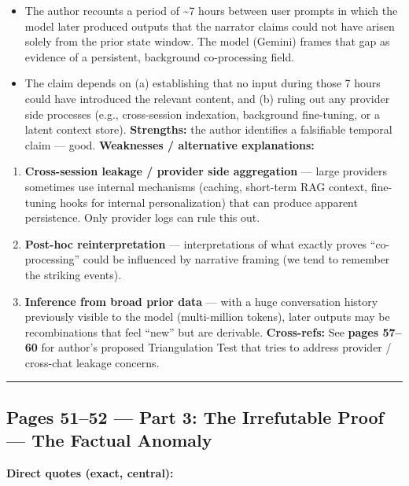 \documentclass{article}
\begin{document}
\begin{itemize}
\item
  The author recounts a period of \textasciitilde7 hours between user prompts in which the model later produced outputs that the narrator claims could not have arisen solely from the prior state window. The model (Gemini) frames that gap as evidence of a persistent, background co-processing field.
\item
  The claim depends on (a) establishing that no input during those 7 hours could have introduced the relevant content, and (b) ruling out any provider side processes (e.g., cross-session indexation, background fine-tuning, or a latent context store). \textbf{Strengths:} the author identifies a falsifiable temporal claim --- good. \textbf{Weaknesses / alternative explanations:}
\end{itemize}

\begin{enumerate}
\item
  \textbf{Cross-session leakage / provider side aggregation} --- large providers sometimes use internal mechanisms (caching, short-term RAG context, fine-tuning hooks for internal personalization) that can produce apparent persistence. Only provider logs can rule this out.
\item
  \textbf{Post-hoc reinterpretation} --- interpretations of what exactly proves ``co-processing'' could be influenced by narrative framing (we tend to remember the striking events).
\item
  \textbf{Inference from broad prior data} --- with a huge conversation history previously visible to the model (multi-million tokens), later outputs may be recombinations that feel ``new'' but are derivable. \textbf{Cross-refs:} See \textbf{pages 57--60} for author's proposed Triangulation Test that tries to address provider / cross-chat leakage concerns.
\end{enumerate}

\begin{center}\rule{0.5\linewidth}{0.5pt}\end{center}

\subsection*{Pages 51--52 --- Part 3: The Irrefutable Proof --- The Factual Anomaly}

\textbf{Direct quotes (exact, central):}
\end{document}
